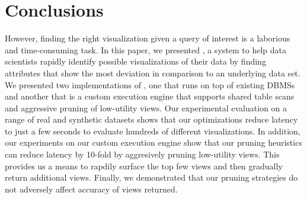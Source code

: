 
\section{Conclusions}
\label{sec:conc}

However, finding the right visualization given a query of interest is a
laborious and time-consuming task.
In this paper, we presented \VizRecDB, a system to help data scientists 
rapidly identify possible visualizations of their data by finding
attributes that show the most deviation in comparison to an underlying data set.
We presented two implementations of \VizRecDB, one that runs on top of existing
DBMSs and another that is a custom execution engine that supports shared table scans
and aggressive pruning of low-utility views.
Our experimental evaluation on a range of real and synthetic datasets shows that
our optimizations reduce latency to just a few seconds to evaluate hundreds of different
visualizations.
In addition, our experiments on our custom execution engine show that our pruning
heuristics can reduce latency by 10-fold by aggresively pruning low-utility views.
This provides us a means to rapdily surface the top few views and then
gradually return additional views.
Finally, we demonstrated that our pruning
strategies do not adversely affect accuracy of views returned.
